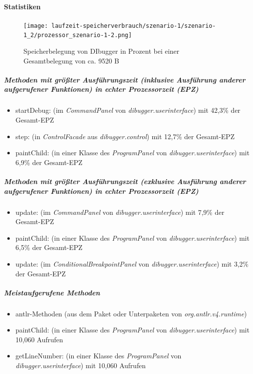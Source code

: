 \documentclass[parskip=full]{scrartcl}
\begin{document}
        \paragraph{Statistiken}
        \begin{figure}[!h]
            \centering
            \texttt{[image: laufzeit-speicherverbrauch/szenario-1/szenario-1\_2/prozessor\_szenario-1-2.png]}
            \caption{Speicherbelegung von DIbugger in Prozent bei einer Gesamtbelegung von ca. 9520 B}
        \end{figure}
        \subparagraph{Methoden mit größter Ausführungszeit (inklusive Ausführung anderer aufgerufener Funktionen) in echter Prozessorzeit (EPZ)}
        \begin{itemize}
            \item{startDebug}: (im \textit{CommandPanel} von \textit{dibugger.userinterface}) mit 42,3\% der Gesamt-EPZ
            \item{step}: (in \textit{ControlFacade} aus \textit{dibugger.control}) mit 12,7\% der Gesamt-EPZ
            \item{paintChild}: (in einer Klasse des \textit{ProgramPanel} von \textit{dibugger.userinterface}) mit 6,9\% der Gesamt-EPZ
        \end{itemize}
        \subparagraph{Methoden mit größter Ausführungszeit (exklusive Ausführung anderer aufgerufener Funktionen) in echter Prozessorzeit (EPZ)}
        \begin{itemize}
            \item{update}: (im \textit{CommandPanel} von \textit{dibugger.userinterface}) mit 7,9\% der Gesamt-EPZ 
            \item{paintChild}: (in einer Klasse des \textit{ProgramPanel} von \textit{dibugger.userinterface}) mit 6,5\% der Gesamt-EPZ
            \item{update}: (im \textit{ConditionalBreakpointPanel} von \textit{dibugger.userinterface}) mit 3,2\% der Gesamt-EPZ 
        \end{itemize}
        \subparagraph{Meistaufgerufene Methoden}
        \begin{itemize}
            \item{antlr-Methoden} (aus dem Paket oder Unterpaketen von \textit{org.antlr.v4.runtime}) 
            \item{paintChild}: (in einer Klasse des \textit{ProgramPanel} von \textit{dibugger.userinterface}) mit 10,060 Aufrufen
            \item{getLineNumber}: (in einer Klasse des \textit{ProgramPanel} von \textit{dibugger.userinterface}) mit 10,060 Aufrufen
        \end{itemize}
\end{document}
